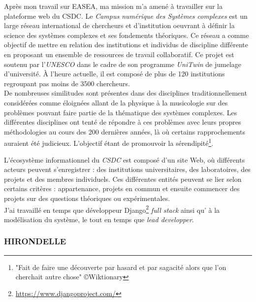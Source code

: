 \documentclass[french, 11pt]{memoir}
\begin{document}
Après mon travail sur EASEA, ma mission m'a amené à travailler sur la
plateforme web du CSDC. Le \emph{Campus numérique des Systèmes
complexes} est un large réseau international de chercheurs et
d'institution oeuvrant à définir la science des systèmes complexes et
ses fondements théoriques. Ce réseau a comme objectif de mettre en
relation des institutions et individus de discipline différente en
proposant un ensemble de ressources de travail collaboratif. Ce projet
est soutenu par l'\emph{UNESCO} dans le cadre de son programme
\emph{UniTwin} de jumelage d'université. À l'heure actuelle, il est
composé de plus de 120 institutions regroupant pas moins de 3500
chercheurs. \\
De nombreuses similitudes sont présentes dans des disciplines
traditionnellement considérées comme éloignées allant de la physique à
la musicologie sur des problèmes pouvant faire partie de la thématique
des systèmes complexes. Les différentes disciplines ont tenté de
répondre à ces problèmes avec leurs propres méthodologies au cours des
200 dernières années, là où certains rapprochements auraient été
judicieux. L'objectif étant de promouvoir la sérendipité\footnote{"Fait de faire une découverte par hasard et par sagacité alors que l’on cherchait autre chose" \copyright Wiktionary}.

\bigskip
L'écosystème informationnel du \emph{CSDC} est composé d'un site Web, où
différents acteurs peuvent s'enregistrer : des institutions
universitaires, des laboratoires, des projets et des membres
individuels. Ces différentes entités peuvent se lier selon certains
critères : appartenance, projets en commun et ensuite commencer des
projets sur des questions théoriques ou expérimentales. \\
J'ai travaillé en temps que développeur Django\footnote{\url{https://www.djangoproject.com/}} \emph{full stack} ainsi
qu' à la modélisation du système, le tout en temps que \textit{lead
developper}.

\subsubsection{HIRONDELLE}\label{hirondelle}
\end{document}
